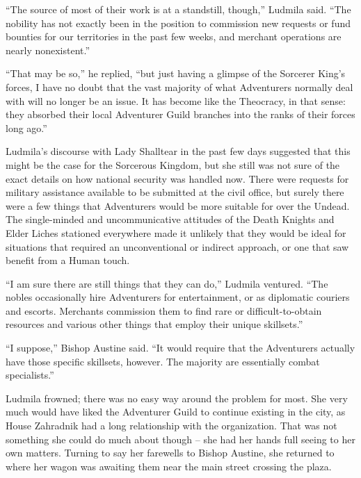  

“The source of most of their work is at a standstill, though,” Ludmila said. “The nobility has not exactly been in the position to commission new requests or fund bounties for our territories in the past few weeks, and merchant operations are nearly nonexistent.”

 

“That may be so,” he replied, “but just having a glimpse of the Sorcerer King’s forces, I have no doubt that the vast majority of what Adventurers normally deal with will no longer be an issue. It has become like the Theocracy, in that sense: they absorbed their local Adventurer Guild branches into the ranks of their forces long ago.”

 

Ludmila’s discourse with Lady Shalltear in the past few days suggested that this might be the case for the Sorcerous Kingdom, but she still was not sure of the exact details on how national security was handled now. There were requests for military assistance available to be submitted at the civil office, but surely there were a few things that Adventurers would be more suitable for over the Undead. The single-minded and uncommunicative attitudes of the Death Knights and Elder Liches stationed everywhere made it unlikely that they would be ideal for situations that required an unconventional or indirect approach, or one that saw benefit from a Human touch.

 

“I am sure there are still things that they can do,” Ludmila ventured. “The nobles occasionally hire Adventurers for entertainment, or as diplomatic couriers and escorts. Merchants commission them to find rare or difficult-to-obtain resources and various other things that employ their unique skillsets.”

 

“I suppose,” Bishop Austine said. “It would require that the Adventurers actually have those specific skillsets, however. The majority are essentially combat specialists.”

 

Ludmila frowned; there was no easy way around the problem for most. She very much would have liked the Adventurer Guild to continue existing in the city, as House Zahradnik had a long relationship with the organization. That was not something she could do much about though – she had her hands full seeing to her own matters. Turning to say her farewells to Bishop Austine, she returned to where her wagon was awaiting them near the main street crossing the plaza.

